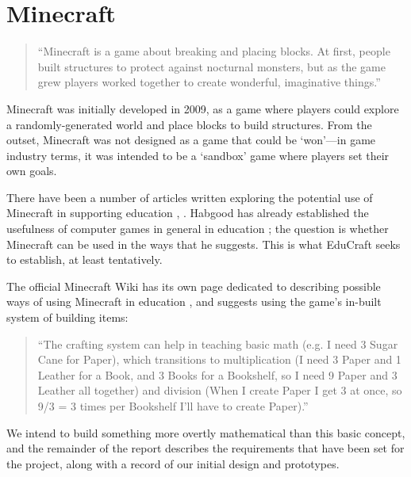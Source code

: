 \section{Minecraft}
\begin{quote}
``Minecraft is a game about breaking and placing blocks. At first, people
built structures to protect against nocturnal monsters, but as the game grew
players worked together to create wonderful, imaginative things.''
\cite{website:minecraft}
\end{quote}

Minecraft was initially developed in 2009, as a game where players could
explore a randomly-generated world and place blocks to build structures. From
the outset, Minecraft was not designed as a game that could be `won'---in
game industry terms, it was intended to be a `sandbox' game where players set
their own goals.

There have been a number of articles written exploring the potential use of
Minecraft in supporting education \cite{brand13}, \cite{short12}. Habgood has
already established the usefulness of computer games in general in education
\cite{habgood07}; the question is whether Minecraft can be used in the ways
that he suggests. This is what EduCraft seeks to establish, at least tentatively.

The official Minecraft Wiki has its own page dedicated to describing possible ways
of using Minecraft in education \cite{website:mcwiki}, and suggests using the
game's in-built system of building items:
\begin{quote}
    ``The crafting system can help in teaching basic math (e.g. I need 3 Sugar 
    Cane for Paper), which transitions to multiplication (I need 3 Paper and 1 
    Leather for a Book, and 3 Books for a Bookshelf, so I need 9 Paper and 3 Leather 
    all together) and division (When I create Paper I get 3 at once, so 9/3 = 
    3 times per Bookshelf I'll have to create Paper).''
\end{quote}

We intend to build something more overtly mathematical than this basic concept,
and the remainder of the report describes the requirements that have been set
for the project, along with a record of our initial design and prototypes.